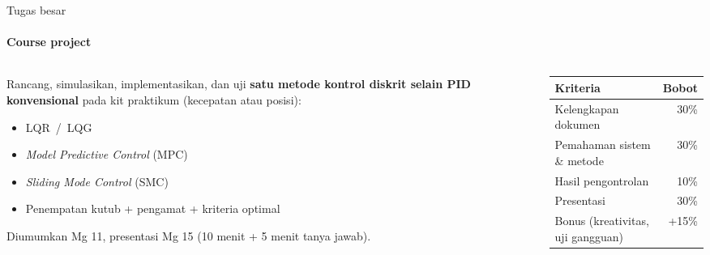 \documentclass[aspectratio=169,10pt]{beamer}
\begin{document}
\begin{frame}{Tugas besar}
	\framesubtitle{Course project}
	\begin{columns}[T]
		\begin{column}{0.52\textwidth}
			Rancang, simulasikan, implementasikan, dan uji \textbf{satu metode kontrol diskrit selain PID konvensional} pada kit praktikum (kecepatan atau posisi):
			\begin{itemize}
				\item LQR \,/\, LQG
				\item \textit{Model Predictive Control} (MPC)
				\item \textit{Sliding Mode Control} (SMC)
				\item Penempatan kutub + pengamat + kriteria optimal
			\end{itemize}
			\vspace{0.1cm}
			{\small Diumumkan Mg 11, presentasi Mg 15 (10 menit + 5 menit tanya jawab).}
		\end{column}
		\begin{column}{0.44\textwidth}
			\footnotesize
			\begin{tabular}{@{}l r@{}}
				\toprule
				\textbf{Kriteria} & \textbf{Bobot} \\
				\midrule
				Kelengkapan dokumen & 30\% \\
				Pemahaman sistem \& metode & 30\% \\
				Hasil pengontrolan & 10\% \\
				Presentasi & 30\% \\
				Bonus (kreativitas, uji gangguan) & +15\% \\
				\bottomrule
			\end{tabular}
		\end{column}
	\end{columns}
\end{frame}
\end{document}
